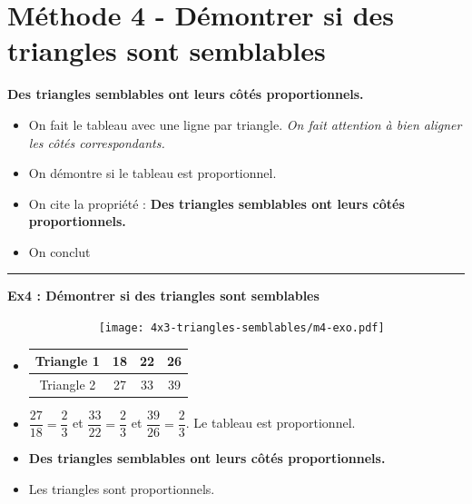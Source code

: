 \documentclass[11pt]{article}
\newcommand{\horrule}[1]{\rule{\linewidth}{#1}} %
\begin{document}
\section*{Méthode 4 - Démontrer si des triangles sont semblables}

\textbf{Des triangles semblables ont leurs côtés proportionnels.} 

\begin{itemize}
  \item On fait le tableau avec une ligne par triangle. \textit{On fait attention à bien aligner les côtés correspondants.}
  \item On démontre si le tableau est proportionnel.
  \item On cite la propriété : \textbf{Des triangles semblables ont leurs côtés proportionnels.} 
  \item On conclut
\end{itemize}

\horrule{1px}
\textbf{Ex4 : Démontrer si des triangles sont semblables}

\begin{multicols}{2}
  \begin{figure}[H]
        \centering
        \texttt{[image: 4x3-triangles-semblables/m4-exo.pdf]}
  \end{figure}
  \columnbreak

  \begin{itemize}
    \item     
    \begin{tabular}{|c|c|c|c|}
      \hline
      Triangle 1 & 18 & 22 & 26 \\  \hline
      Triangle 2 & 27 & 33 & 39\\  \hline
    \end{tabular}
    \item $\dfrac{27}{18} = \dfrac{2}{3}$ et $\dfrac{33}{22} = \dfrac{2}{3}$ et $\dfrac{39}{26} = \dfrac{2}{3}$. \newline
    Le tableau est proportionnel.
    \item \textbf{Des triangles semblables ont leurs côtés proportionnels.} 
    \item Les triangles sont proportionnels.
  \end{itemize}
  \end{multicols}
\end{document}
